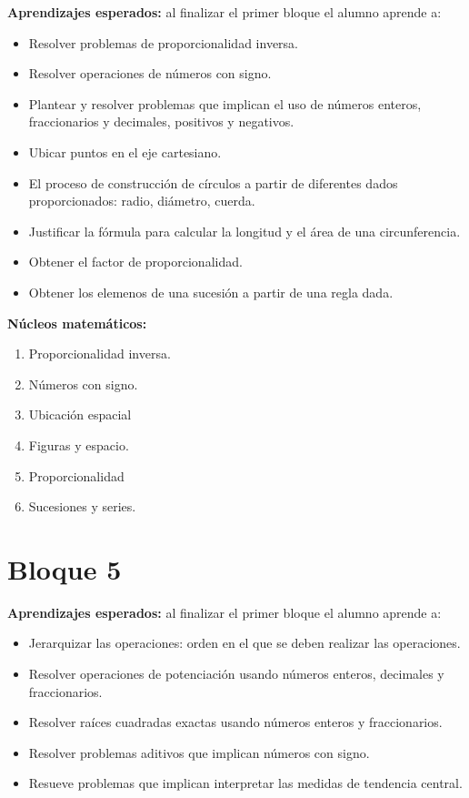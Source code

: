 \documentclass[11pt]{article}
\begin{document}
\textbf{Aprendizajes esperados:} al finalizar el primer bloque el alumno aprende a:

\begin{itemize}
\setlength\itemsep{-0.4em}
    \item Resolver problemas de proporcionalidad inversa.
    \item Resolver operaciones de n\'umeros con signo.
    \item Plantear y resolver problemas que implican el uso de n\'umeros enteros,
    fraccionarios y decimales, positivos y negativos.
    \item Ubicar puntos en el eje cartesiano.
    \item El proceso de construcci\'on de c\'irculos a partir de diferentes
    dados proporcionados: radio, di\'ametro, cuerda.
    \item Justificar la f\'ormula para calcular la longitud  y el \'area de una
    circunferencia.
    \item Obtener el factor de proporcionalidad.
    \item Obtener los elemenos de una sucesi\'on a partir de una regla dada.
\end{itemize}

\textbf{N\'ucleos matem\'aticos:}

\begin{enumerate}
\setlength\itemsep{-0.4em}
    \item Proporcionalidad inversa.
    \item N\'umeros con signo.
    \item Ubicaci\'on espacial
    \item Figuras y espacio.
    \item Proporcionalidad
    \item Sucesiones y series.
\end{enumerate}


\section*{Bloque 5}

\textbf{Aprendizajes esperados:} al finalizar el primer bloque el alumno aprende a:

\begin{itemize}
\setlength\itemsep{-0.4em}
    \item Jerarquizar las operaciones: orden en el que se deben realizar las
    operaciones.
    \item Resolver operaciones de potenciaci\'on usando n\'umeros enteros,
    decimales y fraccionarios.
    \item Resolver ra\'ices cuadradas exactas usando n\'umeros enteros y
    fraccionarios.
    \item Resolver problemas aditivos que implican n\'umeros con signo.
    \item Resueve problemas que implican interpretar las medidas de tendencia
    central.
\end{itemize}
\end{document}
